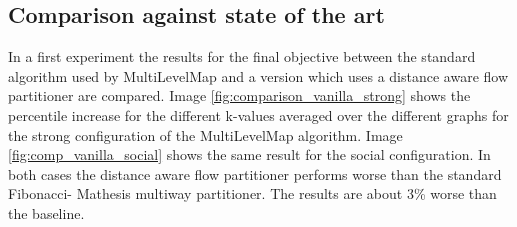 \documentclass[acmsmall,nonacm,screen,review]{acmart}
\begin{document}
\subsection{Comparison against state of the art}
In a first experiment the results for the final objective between the standard algorithm used by 
MultiLevelMap and a version which uses a distance aware flow partitioner are compared. Image \ref{fig:comparison_vanilla_strong}
shows the percentile increase for the different k-values averaged over the different graphs for the
strong configuration of the MultiLevelMap algorithm. Image \ref{fig:comp_vanilla_social} shows the same result for the social
configuration. In both cases the distance aware flow partitioner performs worse than the standard Fibonacci-
Mathesis multiway partitioner. The results are about 3\% worse than the baseline.
\end{document}
